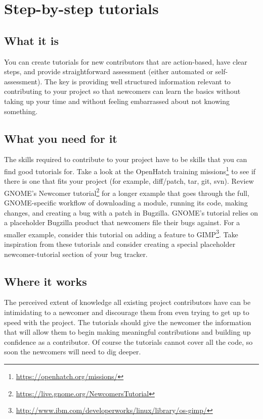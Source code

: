 \section{Step-by-step tutorials}
\subsection{What it is}
You can create tutorials for new contributors that are action-based, have clear steps, and provide straightforward assessment (either automated or self-assessment). The key is providing well structured information relevant to contributing to your project so that newcomers can learn the basics without taking up your time and without feeling embarrassed about not knowing something.

\subsection{What you need for it}
The skills required to contribute to your project have to be skills that you can find good tutorials for. Take a look at the OpenHatch training missions\footnote{\url{https://openhatch.org/missions/}} to see if there is one that fits your project (for example, diff/patch, tar, git, svn). Review GNOME’s Newcomer tutorial\footnote{\url{https://live.gnome.org/NewcomersTutorial}} for a longer example that goes through the full, GNOME-specific workflow of downloading a module, running its code, making changes, and creating a bug with a patch in Bugzilla. GNOME’s tutorial relies on a placeholder Bugzilla product that newcomers file their bugs against. For a smaller example, consider this tutorial on adding a feature to GIMP\footnote{\url{http://www.ibm.com/developerworks/linux/library/os-gimp/}}. Take inspiration from these tutorials and consider creating a special placeholder newcomer-tutorial section of your bug tracker.

\subsection{Where it works}
The perceived extent of knowledge all existing project contributors have can be intimidating to a newcomer and discourage them from even trying to get up to speed with the project. The tutorials should give the newcomer the information that will allow them to begin
making meaningful contributions and building up confidence as a contributor. Of course the
tutorials cannot cover all the code, so soon the newcomers will need to dig deeper.

